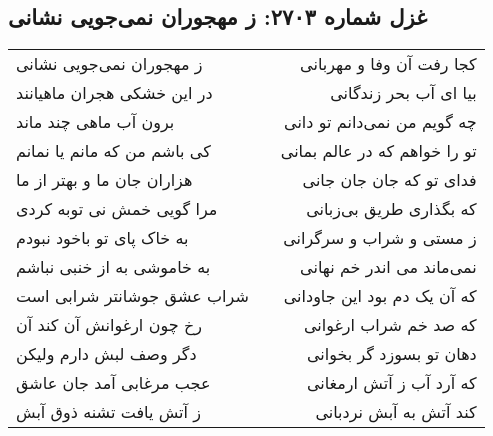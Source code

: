 \begin{center}
\section*{غزل شماره ۲۷۰۳: ز مهجوران نمی‌جویی نشانی}
\label{sec:2703}
\begin{longtable}{l p{0.5cm} r}
ز مهجوران نمی‌جویی نشانی
&&
کجا رفت آن وفا و مهربانی
\\
در این خشکی هجران ماهیانند
&&
بیا ای آب بحر زندگانی
\\
برون آب ماهی چند ماند
&&
چه گویم من نمی‌دانم تو دانی
\\
کی باشم من که مانم یا نمانم
&&
تو را خواهم که در عالم بمانی
\\
هزاران جان ما و بهتر از ما
&&
فدای تو که جان جان جانی
\\
مرا گویی خمش نی توبه کردی
&&
که بگذاری طریق بی‌زبانی
\\
به خاک پای تو باخود نبودم
&&
ز مستی و شراب و سرگرانی
\\
به خاموشی به از خنبی نباشم
&&
نمی‌ماند می اندر خم نهانی
\\
شراب عشق جوشانتر شرابی است
&&
که آن یک دم بود این جاودانی
\\
رخ چون ارغوانش آن کند آن
&&
که صد خم شراب ارغوانی
\\
دگر وصف لبش دارم ولیکن
&&
دهان تو بسوزد گر بخوانی
\\
عجب مرغابی آمد جان عاشق
&&
که آرد آب ز آتش ارمغانی
\\
ز آتش یافت تشنه ذوق آبش
&&
کند آتش به آبش نردبانی
\\
\end{longtable}
\end{center}
